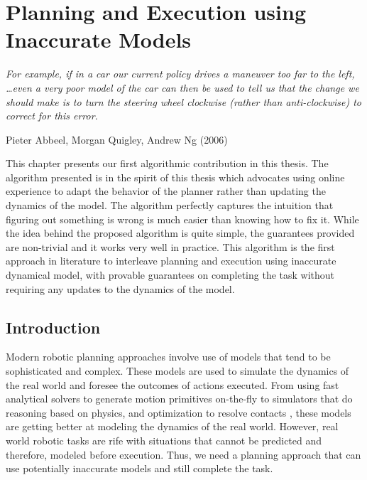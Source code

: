 \chapter{Planning and Execution using Inaccurate Models}
\label{cha:plann-exec}

\epigraph{\textit{For example, if in a car our current policy drives a
    maneuver too far to the left, \ldots even a very poor model of the
    car can then be used to tell us that 
    the change we should make is to turn the steering wheel clockwise
    (rather than anti-clockwise) to correct for this error.}}{Pieter
  Abbeel, Morgan Quigley, Andrew Ng (2006)}


This chapter presents our first algorithmic contribution in this
thesis. The algorithm presented is in the spirit of this thesis which
advocates using online experience to adapt the behavior of the planner
rather than updating the dynamics of the model. The algorithm
perfectly captures the intuition that figuring out something is
wrong is much easier than knowing how to fix it. While the idea behind
the proposed algorithm is quite simple, the guarantees provided are
non-trivial and it works very well in practice. This algorithm is the
first approach in literature to interleave planning and execution using inaccurate
dynamical model,
with provable guarantees on completing the task without requiring any
updates to the dynamics of the model.

\section{Introduction}
\label{sec:introduction}

Modern robotic planning approaches involve use of models that tend to
be sophisticated and complex. These models are used to simulate the
dynamics of the real world and foresee the outcomes of actions
executed. From using fast analytical solvers to generate motion
primitives on-the-fly \cite{DBLP:conf/icra/CohenSCL11} to 
simulators that do reasoning based on physics, and optimization to resolve
contacts \cite{DBLP:conf/iros/TodorovET12}, these models are getting better at
modeling the dynamics of the real world. However, real world robotic
tasks are rife with situations that cannot be predicted and therefore,
modeled before execution. Thus, we need a
planning approach that can use potentially inaccurate models and still
complete the task.

